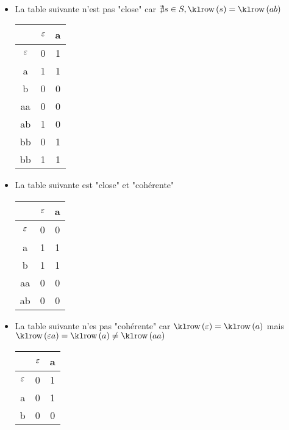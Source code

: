 \begin{exemple} \label{ex:tables}
	\ \newline
	\begin{itemize}
		\item La table suivante n'est pas "close" car $\nexists s \in S, \row s = \row {ab}$
		      \begin{center}
			      \begin{tabular}{c|c|c}
				                 & $\varepsilon$ & a \\ \hline
				      $\varepsilon$ & 0          & 1 \\
				      a          & 1          & 1 \\
				      b          & 0          & 0 \\ \hline

				      aa         & 0          & 0 \\
				      ab         & 1          & 0 \\
				      bb         & 0          & 1 \\
				      bb         & 1          & 1 \\
			      \end{tabular}
		      \end{center}

		\item La table suivante est "close" et "cohérente"
		      \begin{center}
			      \begin{tabular}{c|c|c}
				                 & $\varepsilon$ & a \\ \hline
				      $\varepsilon$ & 0          & 0 \\
				      a          & 1          & 1 \\ \hline

				      b          & 1          & 1 \\
				      aa         & 0          & 0 \\
				      ab         & 0          & 0 \\
			      \end{tabular}
		      \end{center}
		\item La table suivante n'es pas "cohérente" car $\row {\motvide} = \row a$ mais
		      $\row {\motvide a} = \row a \neq \row {aa}$

		      \begin{center}
			      \begin{tabular}{c|c|c}
				                 & $\varepsilon$ & a \\ \hline
				      $\varepsilon$ & 0          & 1 \\
				      a          & 0          & 1 \\
				      b          & 0          & 0 \\ \hline


\end{tabular}
\end{center}
\end{itemize}
\end{exemple}
